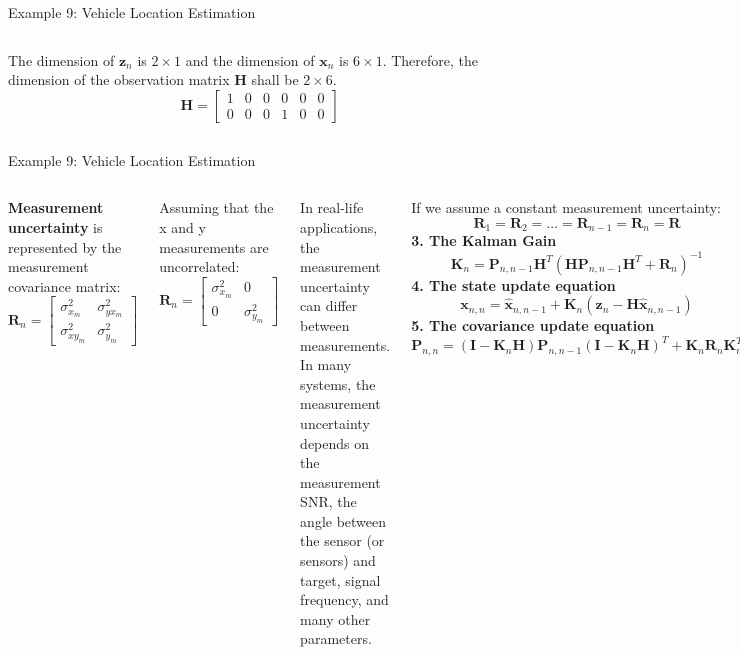 \begin{frame}{Example 9: Vehicle Location Estimation}
\begin{columns}
        The dimension of $\mathbf{z}_n$ is $2 \times 1$ and the dimension of $\mathbf{x}_n$ is $6 \times 1$. Therefore, the dimension of the observation matrix $\mathbf{H}$ shall be $2 \times 6$.
        \[
        \mathbf{H} =
        \begin{bmatrix}
        1 & 0 & 0 & 0 & 0 & 0 \\
        0 & 0 & 0 & 1 & 0 & 0
        \end{bmatrix}
        \]
\end{columns}

\end{frame}


\begin{frame}{Example 9: Vehicle Location Estimation}
\begin{columns}
        \textbf{Measurement uncertainty}
        is represented by the measurement covariance matrix:
        \[
        \mathbf{R}_n =
        \begin{bmatrix}
        \sigma^2_{x_m} & \sigma^2_{yx_m} \\
        \sigma^2_{xy_m} & \sigma^2_{y_m}
        \end{bmatrix}
        \]
        
        Assuming that the x and y measurements are uncorrelated:
        \[
        \mathbf{R}_n =
        \begin{bmatrix}
        \sigma^2_{x_m} & 0 \\
        0 & \sigma^2_{y_m}
        \end{bmatrix}
        \]
        
        In real-life applications, the measurement uncertainty can differ between measurements. In many systems, the measurement uncertainty depends on the measurement SNR, the angle between the sensor (or sensors) and target, signal frequency, and many other parameters.
        
        If we assume a constant measurement uncertainty:
        \[
        \mathbf{R}_1 = \mathbf{R}_2 = \ldots = \mathbf{R}_{n-1} = \mathbf{R}_n = \mathbf{R}
        \]
        \textbf{3. The Kalman Gain}
        \[
        \mathbf{K}_n = \mathbf{P}_{n,n-1} \mathbf{H}^T \left( \mathbf{H} \mathbf{P}_{n,n-1} \mathbf{H}^T + \mathbf{R}_n \right)^{-1}
        \]
        \textbf{4. The state update equation}
        \[
        \mathbf{x}_{n,n} = \hat{\mathbf{x}}_{n,n-1} + \mathbf{K}_n (\mathbf{z}_n - \mathbf{H} \hat{\mathbf{x}}_{n,n-1})
        \]
         \textbf{5. The covariance update equation}
         \[
            \mathbf{P}_{n,n} = (\mathbf{I} - \mathbf{K}_n \mathbf{H}) \mathbf{P}_{n,n-1} (\mathbf{I} - \mathbf{K}_n \mathbf{H})^T + \mathbf{K}_n \mathbf{R}_n \mathbf{K}_n^T
            \]

        
\end{columns}

\end{frame}

